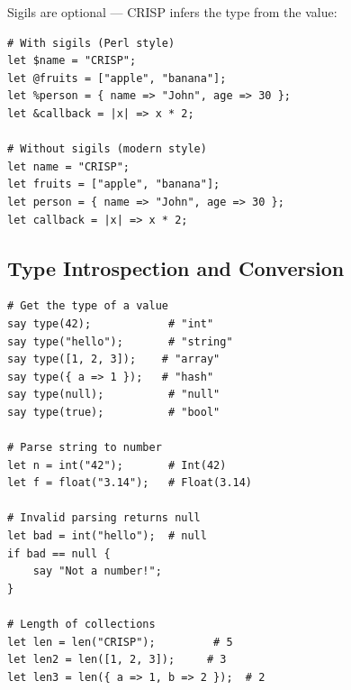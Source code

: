 Sigils are optional — CRISP infers the type from the value:

\begin{tcolorbox}[colback=codebg, colframe=darkpurple, colbacktitle=darkpurple, title=\textbf{\textcolor{codegold}{Sigil Usage}}, fonttitle=\bfseries, sharp corners]
\begin{lstlisting}
# With sigils (Perl style)
let $name = "CRISP";
let @fruits = ["apple", "banana"];
let %person = { name => "John", age => 30 };
let &callback = |x| => x * 2;

# Without sigils (modern style)
let name = "CRISP";
let fruits = ["apple", "banana"];
let person = { name => "John", age => 30 };
let callback = |x| => x * 2;
\end{lstlisting}
\end{tcolorbox}

\subsection{Type Introspection and Conversion}

\begin{tcolorbox}[colback=codebg, colframe=darkpurple, colbacktitle=darkpurple, title=\textbf{\textcolor{codegold}{Type Functions}}, fonttitle=\bfseries, sharp corners]
\begin{lstlisting}
# Get the type of a value
say type(42);            # "int"
say type("hello");       # "string"
say type([1, 2, 3]);    # "array"
say type({ a => 1 });   # "hash"
say type(null);          # "null"
say type(true);          # "bool"

# Parse string to number
let n = int("42");       # Int(42)
let f = float("3.14");   # Float(3.14)

# Invalid parsing returns null
let bad = int("hello");  # null
if bad == null {
    say "Not a number!";
}

# Length of collections
let len = len("CRISP");         # 5
let len2 = len([1, 2, 3]);     # 3
let len3 = len({ a => 1, b => 2 });  # 2
\end{lstlisting}
\end{tcolorbox}
